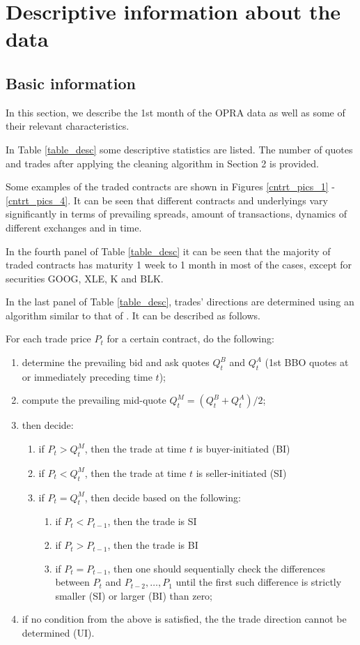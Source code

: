 \documentclass[a4paper,12pt]{article}
\theoremstyle{plain}
\theoremstyle{definition}
\begin{document}
\newpage

\section{Descriptive information about the data}

\subsection{Basic information}

In this section, we describe the 1st month of the OPRA data as well as some of their relevant characteristics.

In Table \ref{table_desc} some descriptive statistics are listed. The number of quotes and trades after applying the cleaning algorithm in Section 2 is provided. 

Some examples of the traded contracts are shown in Figures \ref{cntrt_pics_1} - \ref{cntrt_pics_4}. It can be seen that different contracts and underlyings vary significantly in terms of prevailing spreads, amount of transactions, dynamics of different exchanges and in time.

In the fourth panel of Table \ref{table_desc} it can be seen that the majority of traded contracts has maturity 1 week to 1 month in most of the cases, except for securities GOOG, XLE, K and BLK.

In the last panel of Table \ref{table_desc}, trades' directions are determined using an algorithm similar to that of \citet{lee_ready}. It can be described as follows.

For each trade price $P_t$ for a certain contract, do the following:

\begin{enumerate}
\item
determine the prevailing bid and ask quotes $Q_t^B$ and $Q_t^A$ (1st BBO quotes at or immediately preceding time $t$);
\item
compute the prevailing mid-quote $Q_t^M = (Q_t^B + Q_t^A)/2$;
\item
then decide:
	\begin{enumerate}
	\item
	if $P_t > Q_t^M$, then the trade at time $t$ is buyer-initiated (BI)
	\item
	if $P_t < Q_t^M$, then the trade at time $t$ is seller-initiated (SI)
	\item
	if $P_t = Q_t^M$, then decide based on the following:
		\begin{enumerate}
		\item
		if $P_t < P_{t-1}$, then the trade is SI
		\item
		if $P_t > P_{t-1}$, then the trade is BI
		\item
		if $P_t = P_{t-1}$, then one should sequentially check the differences between $P_t$ and $P_{t-2}, \ldots,  P_1$ until the first such difference is strictly smaller (SI) or larger (BI) than zero;
		\end{enumerate}
	\end{enumerate}
\item
if no condition from the above is satisfied, the the trade direction cannot be determined (UI).
\end{enumerate}
\end{document}
